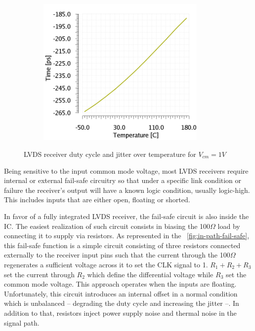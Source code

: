 \begin{figure}[htp]
\begin{subfigure}[b]{0.32\textwidth}
        \includegraphics[width=0.9\textwidth]{Chapter5/Figs/lvds/ErrorClockPeriod-Vcm1V.png}
    \end{subfigure}
    \caption{LVDS receiver duty cycle and jitter over temperature for $V_{cm} = 1 V$}
    \label{fig:lvds-receiver-res1V}
\end{figure}

Being sensitive to the input common mode voltage, most LVDS receivers require internal or external fail-safe circuitry so that under a specific link condition or failure the receiver's output will have a known logic condition, usually logic-high. This includes inputs that are either open, floating or shorted.

In favor of a fully integrated LVDS receiver, the fail-safe circuit is also inside the IC\@. The easiest realization of such circuit consists in biasing the 100$\Omega$ load by connecting it to supply via resistors. As represented in the \figurename~\ref{fig:in-path-fail-safe}, this fail-safe function is a simple circuit consisting of three resistors connected externally to the receiver input pins such that the current through the 100$\Omega$ regenerates a sufficient voltage across it to set the CLK signal to 1. $R_1+R_2+R_3$ set the current through $R_2$ which define the differential voltage while $R_3$ set the common mode voltage. This approach operates when the inputs are floating. Unfortunately, this circuit introduces an internal offset in a normal condition which is unbalanced -- degrading the duty cycle and increasing the jitter --. In addition to that, resistors inject power supply noise and thermal noise in the signal path.

